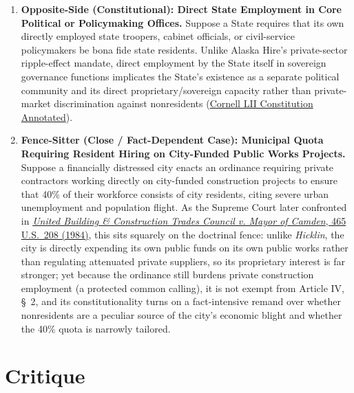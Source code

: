 \documentclass[12pt]{article}
\begin{document}
\begin{enumerate}
    \item \textbf{Opposite-Side (Constitutional): Direct State Employment in Core Political or Policymaking Offices.} Suppose a State requires that its own directly employed state troopers, cabinet officials, or civil-service policymakers be bona fide state residents. Unlike Alaska Hire's private-sector ripple-effect mandate, direct employment by the State itself in sovereign governance functions implicates the State's existence as a separate political community and its direct proprietary/sovereign capacity rather than private-market discrimination against nonresidents (\href{https://www.law.cornell.edu/constitution-conan/article-4/section-2/clause-1/privileges-and-immunity-clause-doctrine-and-practice}{Cornell LII Constitution Annotated}).

    \item \textbf{Fence-Sitter (Close / Fact-Dependent Case): Municipal Quota Requiring Resident Hiring on City-Funded Public Works Projects.} Suppose a financially distressed city enacts an ordinance requiring private contractors working directly on city-funded construction projects to ensure that 40\% of their workforce consists of city residents, citing severe urban unemployment and population flight. As the Supreme Court later confronted in \href{https://supreme.justia.com/cases/federal/us/465/208/}{\textit{United Building \& Construction Trades Council v. Mayor of Camden}, 465 U.S.\ 208 (1984)}, this sits squarely on the doctrinal fence: unlike \textit{Hicklin}, the city is directly expending its own public funds on its own public works rather than regulating attenuated private suppliers, so its proprietary interest is far stronger; yet because the ordinance still burdens private construction employment (a protected common calling), it is not exempt from Article IV, \S\ 2, and its constitutionality turns on a fact-intensive remand over whether nonresidents are a peculiar source of the city's economic blight and whether the 40\% quota is narrowly tailored.
\end{enumerate}

\section{Critique}
\end{document}
